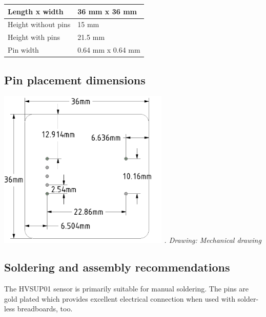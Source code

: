 \documentclass[a4paper]{article}
\newcounter{Drawing}
\renewcommand\theDrawing{\arabic{Drawing}}
\begin{document}
\begin{flushleft}
\tablefirsthead{}
\tablehead{}
\tabletail{}
\tablelasttail{}
\begin{supertabular}{|m{2.23236in}|m{2.0462599in}|}
\hline
{ Length x width} &
{ 36 mm x 36 mm}\\\hline
{ Height without pins} &
{ 15 mm}\\\hline
{ Height with pins} &
{ 21.5 mm}\\\hline
{ Pin width} &
{ 0.64 mm x 0.64 mm}\\\hline
\end{supertabular}
\end{flushleft}

\bigskip

\subsection[Pin placement dimensions]{ Pin placement dimensions}
\hypertarget{RefHeadingToc12331084818799}{}
\bigskip



\begin{center}
\begin{minipage}{3.2563in}
{\itshape
 \includegraphics[width=3.2016in,height=2.9811in]{HVSUP01UM-img006.jpg} \stepcounter{Drawing}{\theDrawing}. Drawing:
Mechanical drawing}
\end{minipage}
\end{center}
\clearpage
\bigskip

\subsection[Soldering and assembly recommendations]{ Soldering and assembly recommendations}
\hypertarget{RefHeadingToc1471383566216}{}{
The HVSUP01 sensor is primarily suitable for manual soldering. The pins are gold plated which provides excellent
electrical connection when used with solder-less breadboards, too.}
\end{document}
